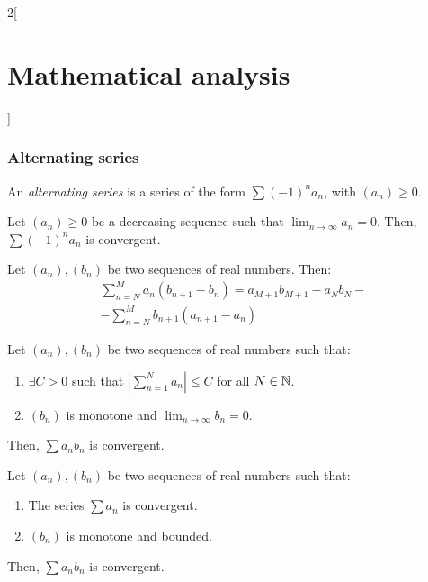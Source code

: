 \documentclass[../../../main.tex]{subfiles}
\begin{document}
\begin{multicols}{2}[\section{Mathematical analysis}]
  \subsubsection{Alternating series}
  \begin{definition}
    An \emph{alternating series} is a series of the form $\sum (-1)^na_n$, with $(a_n)\geq 0$.
  \end{definition}
  \begin{theorem}
    Let $(a_n)\geq 0$ be a decreasing sequence such that $\displaystyle\lim_{n\to\infty}a_n=0$. Then, $\sum (-1)^na_n$ is convergent.
  \end{theorem}
  \begin{theorem}
    Let $(a_n),(b_n)$ be two sequences of real numbers. Then:
    \begin{multline*}
      \sum_{n=N}^M a_n(b_{n+1}-b_n)=a_{M+1}b_{M+1}-a_Nb_N-\\
      -\sum_{n=N}^Mb_{n+1}(a_{n+1}-a_n)
    \end{multline*}
  \end{theorem}
  \begin{theorem}
    Let $(a_n),(b_n)$ be two sequences of real numbers such that:
    \begin{enumerate}
      \item $\exists C>0$ such that $\displaystyle\left|\sum_{n=1}^Na_n\right|\leq C$ for all $N\in\mathbb{N} $.
      \item $(b_n)$ is monotone and $\displaystyle\lim_{n\to\infty}b_n=0$.
    \end{enumerate}
    Then, $\sum a_nb_n$ is convergent.
  \end{theorem}
  \begin{theorem}
    Let $(a_n),(b_n)$ be two sequences of real numbers such that:
    \begin{enumerate}
      \item The series $\sum a_n$ is convergent.
      \item $(b_n)$ is monotone and bounded.
    \end{enumerate}
    Then, $\sum a_nb_n$ is convergent.
  \end{theorem}

\end{multicols}
\end{document}

